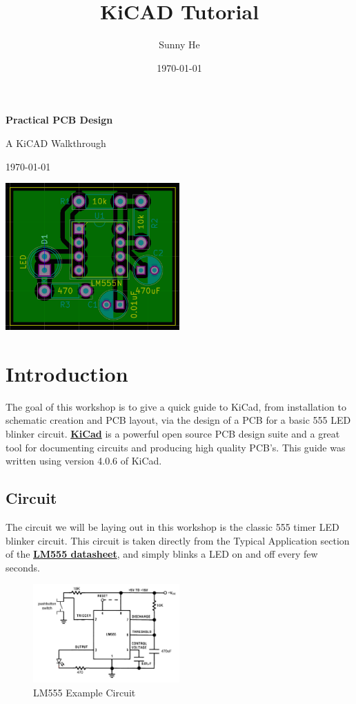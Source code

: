 \documentclass[12pt, oneside]{article}
\title{KiCAD Tutorial}
\date{\today}
\author{Sunny He}
\begin{document}
\begin{titlepage}
	\centering
	\vspace*{5cm}
	{\huge\bfseries Practical PCB Design\par}
	{\Large A KiCAD Walkthrough\par}
	{\large \today\par}
	\vspace{2cm}
	{\includegraphics[width=0.5\textwidth]{TitleCard}\par}
	\vfill
\end{titlepage}

\tableofcontents
\newpage

\section{Introduction}
The goal of this workshop is to give a quick guide to KiCad, from installation to schematic creation and PCB layout, via the design of a PCB for a basic 555 LED blinker circuit. \href{http://kicad-pcb.org/}{\textbf{KiCad}} is a powerful open source PCB design suite and a great tool for documenting circuits and producing high quality PCB's. This guide was written using version 4.0.6 of KiCad.

\subsection{Circuit}
The circuit we will be laying out in this workshop is the classic 555 timer LED blinker circuit. This circuit is taken directly from the Typical Application section of the \href{http://www.ti.com/lit/ds/symlink/lm555.pdf}{\textbf{LM555 datasheet}}, and simply blinks a LED on and off every few seconds.

\begin{figure}[H]
\includegraphics[width=0.5\textwidth]{DatasheetSchematic}
\centering
\caption{LM555 Example Circuit}
\end{figure}
\end{document}
